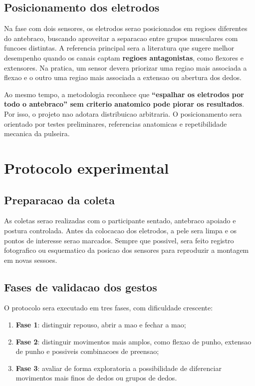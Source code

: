 \documentclass[12pt,oneside,a4paper,brazilian]{abntex2}
\begin{document}
\subsection{Posicionamento dos eletrodos}

Na fase com dois sensores, os eletrodos serao posicionados em regioes diferentes do antebraco, buscando aproveitar a separacao entre grupos musculares com funcoes distintas. A referencia principal sera a literatura que sugere melhor desempenho quando os canais captam \textbf{regioes antagonistas}, como flexores e extensores. Na pratica, um sensor devera priorizar uma regiao mais associada a flexao e o outro uma regiao mais associada a extensao ou abertura dos dedos.

Ao mesmo tempo, a metodologia reconhece que \textbf{``espalhar os eletrodos por todo o antebraco'' sem criterio anatomico pode piorar os resultados}. Por isso, o projeto nao adotara distribuicao arbitraria. O posicionamento sera orientado por testes preliminares, referencias anatomicas e repetibilidade mecanica da pulseira.

\section{Protocolo experimental}

\subsection{Preparacao da coleta}

As coletas serao realizadas com o participante sentado, antebraco apoiado e postura controlada. Antes da colocacao dos eletrodos, a pele sera limpa e os pontos de interesse serao marcados. Sempre que possivel, sera feito registro fotografico ou esquematico da posicao dos sensores para reproduzir a montagem em novas sessoes.

\subsection{Fases de validacao dos gestos}

O protocolo sera executado em tres fases, com dificuldade crescente:

\begin{enumerate}
  \item \textbf{Fase 1}: distinguir repouso, abrir a mao e fechar a mao;
  \item \textbf{Fase 2}: distinguir movimentos mais amplos, como flexao de punho, extensao de punho e possiveis combinacoes de preensao;
  \item \textbf{Fase 3}: avaliar de forma exploratoria a possibilidade de diferenciar movimentos mais finos de dedos ou grupos de dedos.
\end{enumerate}
\end{document}
